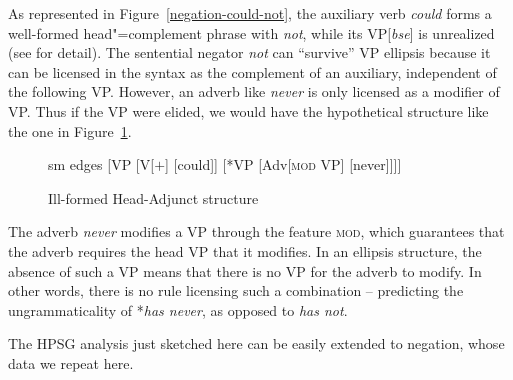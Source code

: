 \documentclass[output=paper
 	        ,biblatex
                ,babelshorthands
                ,newtxmath
                ,draftmode
                ,colorlinks, citecolor=brown
]{langscibook}
\begin{document}
\begin{exe}
\begin{xlist}
\begin{exe}
\begin{xlist}
As represented in Figure~\ref{negation-could-not}, the auxiliary verb \textit{could} forms a well-formed head"=complement phrase with \textit{not}, while its
VP[\textit{bse}] is unrealized (see \citealt{Kim:00, KS:08} for
detail). The sentential negator \textit{not} can ``survive'' VP ellipsis because it can be
licensed in the syntax as the complement of an auxiliary, independent
of the following VP.  However, an adverb like \textit{never} is only
licensed as a modifier of VP. Thus if the VP were elided, we would have the hypothetical
structure like the one in Figure~\ref{negation-fig-could-never}.
\begin{figure}
	\begin{forest}
		sm edges
		[VP
			[V{[\aux $+$]}
				[could]]
			[*VP
				[Adv{[\textsc{mod} VP]}
					[never]]]]
	\end{forest}
\caption{Ill-formed Head-Adjunct structure}\label{negation-fig-could-never}
\end{figure}
The adverb \textit{never} modifies a VP through the feature \textsc{mod},
which guarantees that the adverb requires the head VP that it
modifies. In an ellipsis structure, the absence of such a VP means
that there is no VP for the adverb to modify.  In other words, there
is no rule licensing such a combination -- predicting the
ungrammaticality of *\textit{has never},  as opposed to \textit{has not}.


The HPSG analysis just sketched here can be easily extended to  negation, whose
data we repeat here.

\eal
{}
\zl


\end{xlist}
\end{exe}
\end{xlist}
\end{exe}
\end{document}
